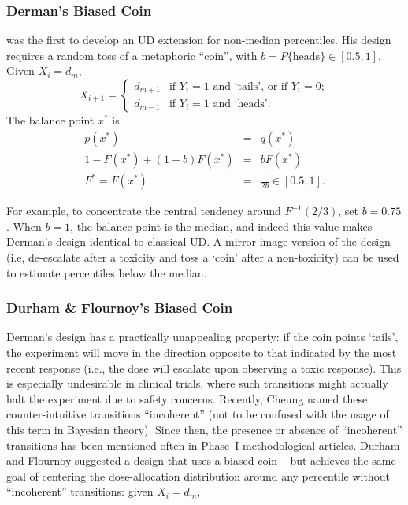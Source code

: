 \subsubsection{Derman's Biased Coin}
\cite{Derm:Nonp:1957} was the first to develop an UD extension for non-median percentiles. His design requires a random toss of a metaphoric ``coin'', with $b=P\{\textrm{heads}\}\in[0.5,1]$. Given $X_i=d_m$,
\begin{equation*}
X_{i+1}=
\begin{cases}
d_{m+1} &\textrm{if $Y_i=1$ and `tails', or if $Y_i=0$};\\
d_{m-1} &\textrm{if $Y_i=1$ and `heads'.}
\end{cases}
\end{equation*}
The balance point $x^*$ is
\begin{equation}\label{eq:dermanx*}
\begin{array}{rcl}
p(x^*)&=&q(x^*)\\
1-F\left(x^*\right)+(1-b)F\left(x^*\right) &=& bF\left(x^*\right)\\
F^*=F\left(x^*\right) &=& \frac{1}{2b}\in[0.5,1].
\end{array}
\end{equation}

For example, to concentrate the central tendency around $F^{-1}(2/3)$, set $b=0.75$. When $b=1$, the balance point is the median, and indeed this value makes Derman's design identical to classical UD. A mirror-image version of the design (i.e, de-escalate after a toxicity and toss a `coin' after a non-toxicity) can be used to estimate percentiles below the median.

\subsubsection{Durham \& Flournoy's  Biased Coin}

Derman's design has a practically unappealing property: if the coin points `tails', the experiment will move in the direction opposite to that indicated by the most recent response (i.e., the dose will escalate upon observing a toxic response). This is especially undesirable in clinical trials, where such transitions might actually halt the experiment due to safety concerns. Recently, Cheung \cite{Cheung:} named these counter-intuitive transitions ``incoherent'' (not to be confused with the usage of this term in Bayesian theory). Since then, the presence or absence of ``incoherent'' transitions has been mentioned often in Phase~I methodological articles. Durham and Flournoy \cite{Durh:Flou:rand:1994} suggested a design that uses a biased coin -- but achieves the same goal of centering the dose-allocation distribution around any percentile without ``incoherent'' transitions: given $X_i=d_m$,

